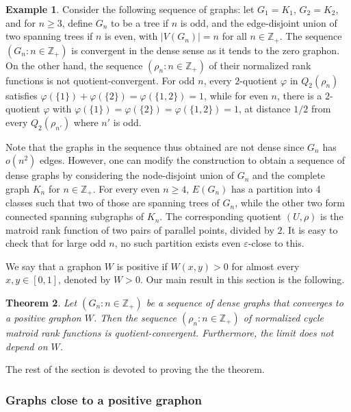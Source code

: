 \documentclass[10pt]{article}
\theoremstyle{plain}
\newtheorem{thm}{Theorem}[section]
\theoremstyle{definition}
\newtheorem{ex}[thm]{Example}
\newcommand{\bbZ}{\mathbb{Z}}
\newcommand{\fg}{\varphi}
\begin{document}
\begin{ex}\label{EXA:DENSE-NOT-CONV}
Consider the following sequence of graphs: let $G_1 = K_1$, $G_2 = K_2$, and for $n \ge 3$, define $G_n$ to be a tree if $n$ is odd, and the edge-disjoint union of two spanning trees if $n$ is even, with $|V(G_n)| = n$ for all $n \in \mathbb{Z}_+$. The sequence $(G_n\colon n\in\bbZ_+)$ is
convergent in the dense sense as it tends to the zero graphon. On the other
hand, the sequence $(\rho_n\colon n\in\bbZ_+)$ of their normalized rank functions is
not quotient-convergent. For odd $n$, every $2$-quotient $\fg$ in $Q_2(\rho_n)$
satisfies $\fg(\{1\})+\fg(\{2\})=\fg(\{1,2\})=1$, while for even $n$, there is a
$2$-quotient $\fg$ with $\fg(\{1\})=\fg(\{2\})=\fg(\{1,2\})=1$, at distance $1/2$ from every
$Q_2(\rho_{n'})$ where $n'$ is odd. 

Note that the graphs in the sequence thus obtained are not dense since $G_n$ has $o(n^2)$ edges. However, one can modify the construction to obtain a sequence of dense graphs by considering the node-disjoint union of $G_n$ and the complete graph $K_n$ for $n\in\bbZ_+$. For every even $n\ge 4$, $E(G_n)$ has a partition into 4 classes such that two of those are spanning trees of $G_n$, while the other two form connected spanning subgraphs of $K_n$. The corresponding quotient $(U,\rho)$ is the matroid rank function of two pairs of parallel points, divided by $2$. It is easy to check that for large odd $n$, no such partition exists even $\varepsilon$-close to this.
\end{ex}

We say that a graphon $W$ is positive if $W(x,y)>0$ for almost every $x,y\in[0,1]$, denoted by $W>0$. Our main result in this section is the following.

\begin{thm}\label{THM:DENSE_CYCLIC_CONV}
    Let $(G_n\colon n\in\bbZ_+)$ be a sequence of dense graphs that converges to a positive graphon $W$. Then the sequence $(\rho_n\colon n\in\bbZ_+)$ of normalized cycle matroid rank functions is quotient-convergent. Furthermore, the limit does not depend on $W$.
\end{thm}

The rest of the section is devoted to proving the the theorem. 

\subsubsection{Graphs close to a positive graphon}
\end{document}

